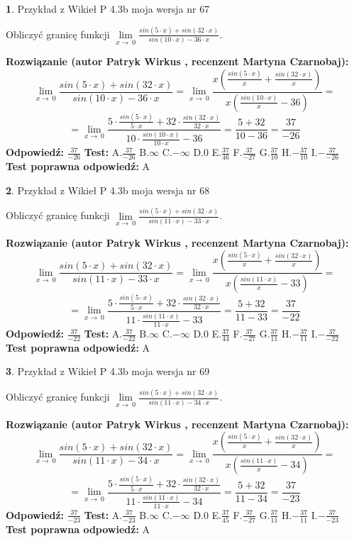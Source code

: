 \documentclass[12pt, a4paper]{article}
\theoremstyle{definition} %
\newtheorem{zad}{}
\newcommand{\zadStart}[1]{\begin{zad}#1\newline}
\newcommand{\zadStop}{\end{zad}}
\newcommand{\rozwStart}[2]{\noindent \textbf{Rozwiązanie (autor #1 , recenzent #2): }\newline}
\newcommand{\rozwStop}{\newline}
\newcommand{\odpStart}{\noindent \textbf{Odpowiedź:}\newline}
\newcommand{\odpStop}{\newline}
\newcommand{\testStart}{\noindent \textbf{Test:}\newline}
\newcommand{\testStop}{\newline}
\newcommand{\kluczStart}{\noindent \textbf{Test poprawna odpowiedź:}\newline}
\newcommand{\kluczStop}{\newline}
\begin{document}
\zadStart{Przykład z Wikieł P 4.3b moja wersja nr 67}


Obliczyć granicę funkcji $\lim\limits_{x\to\ 0}\frac{sin(5 \cdot x)+sin(32 \cdot x)}{sin(10 \cdot x)-36 \cdot x}$.
\zadStop
\rozwStart{Patryk Wirkus}{Martyna Czarnobaj}
$$\lim\limits_{x\to\ 0}\frac{sin(5 \cdot x)+sin(32 \cdot x)}{sin(10 \cdot x)-36 \cdot x}=\lim\limits_{x\to\ 0}\frac{x(\frac{sin(5 \cdot x)}{x}+\frac{sin(32 \cdot x)}{x})}{x(\frac{sin(10 \cdot x)}{x}-36)}=$$
$$=\lim\limits_{x\to\ 0}\frac{5 \cdot \frac{sin(5 \cdot x)}{5 \cdot x}+32 \cdot \frac{sin(32 \cdot x)}{32 \cdot x}}{10 \cdot \frac{sin(10 \cdot x)}{10 \cdot x}-36}=\frac{5+32}{10-36} = \frac{37}{-26}$$
\rozwStop
\odpStart
$\frac{37}{-26}$
\odpStop
\testStart
A.$\frac{37}{-26}$
B.$\infty$
C.$-\infty$
D.$0$
E.$\frac{37}{46}$
F.$\frac{37}{-27}$
G.$\frac{37}{10}$
H.$-\frac{37}{10}$
I.$-\frac{37}{-26}$
\testStop
\kluczStart
A
\kluczStop



\zadStart{Przykład z Wikieł P 4.3b moja wersja nr 68}


Obliczyć granicę funkcji $\lim\limits_{x\to\ 0}\frac{sin(5 \cdot x)+sin(32 \cdot x)}{sin(11 \cdot x)-33 \cdot x}$.
\zadStop
\rozwStart{Patryk Wirkus}{Martyna Czarnobaj}
$$\lim\limits_{x\to\ 0}\frac{sin(5 \cdot x)+sin(32 \cdot x)}{sin(11 \cdot x)-33 \cdot x}=\lim\limits_{x\to\ 0}\frac{x(\frac{sin(5 \cdot x)}{x}+\frac{sin(32 \cdot x)}{x})}{x(\frac{sin(11 \cdot x)}{x}-33)}=$$
$$=\lim\limits_{x\to\ 0}\frac{5 \cdot \frac{sin(5 \cdot x)}{5 \cdot x}+32 \cdot \frac{sin(32 \cdot x)}{32 \cdot x}}{11 \cdot \frac{sin(11 \cdot x)}{11 \cdot x}-33}=\frac{5+32}{11-33} = \frac{37}{-22}$$
\rozwStop
\odpStart
$\frac{37}{-22}$
\odpStop
\testStart
A.$\frac{37}{-22}$
B.$\infty$
C.$-\infty$
D.$0$
E.$\frac{37}{44}$
F.$\frac{37}{-27}$
G.$\frac{37}{11}$
H.$-\frac{37}{11}$
I.$-\frac{37}{-22}$
\testStop
\kluczStart
A
\kluczStop



\zadStart{Przykład z Wikieł P 4.3b moja wersja nr 69}


Obliczyć granicę funkcji $\lim\limits_{x\to\ 0}\frac{sin(5 \cdot x)+sin(32 \cdot x)}{sin(11 \cdot x)-34 \cdot x}$.
\zadStop
\rozwStart{Patryk Wirkus}{Martyna Czarnobaj}
$$\lim\limits_{x\to\ 0}\frac{sin(5 \cdot x)+sin(32 \cdot x)}{sin(11 \cdot x)-34 \cdot x}=\lim\limits_{x\to\ 0}\frac{x(\frac{sin(5 \cdot x)}{x}+\frac{sin(32 \cdot x)}{x})}{x(\frac{sin(11 \cdot x)}{x}-34)}=$$
$$=\lim\limits_{x\to\ 0}\frac{5 \cdot \frac{sin(5 \cdot x)}{5 \cdot x}+32 \cdot \frac{sin(32 \cdot x)}{32 \cdot x}}{11 \cdot \frac{sin(11 \cdot x)}{11 \cdot x}-34}=\frac{5+32}{11-34} = \frac{37}{-23}$$
\rozwStop
\odpStart
$\frac{37}{-23}$
\odpStop
\testStart
A.$\frac{37}{-23}$
B.$\infty$
C.$-\infty$
D.$0$
E.$\frac{37}{45}$
F.$\frac{37}{-27}$
G.$\frac{37}{11}$
H.$-\frac{37}{11}$
I.$-\frac{37}{-23}$
\testStop
\kluczStart
A
\kluczStop
\end{document}
